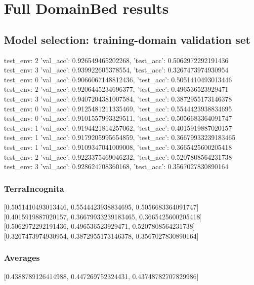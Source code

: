 \documentclass{article}
\begin{document}
\section{Full DomainBed results}

\subsection{Model selection: training-domain validation set}
test_env: 2
{'val_acc': 0.926549465202268, 'test_acc': 0.5062972292191436}
test_env: 3
{'val_acc': 0.939922605378554, 'test_acc': 0.3267473974930954}
test_env: 0
{'val_acc': 0.9066067148812436, 'test_acc': 0.5051410493013446}
test_env: 2
{'val_acc': 0.9206445234696377, 'test_acc': 0.496536523929471}
test_env: 3
{'val_acc': 0.9407204381007584, 'test_acc': 0.3872955173146378}
test_env: 0
{'val_acc': 0.9125481211335469, 'test_acc': 0.5544423938834695}
test_env: 0
{'val_acc': 0.9101557993329511, 'test_acc': 0.5056683364091747}
test_env: 1
{'val_acc': 0.9194421814257062, 'test_acc': 0.4015919887020157}
test_env: 1
{'val_acc': 0.9179205995654859, 'test_acc': 0.36679933239183465}
test_env: 1
{'val_acc': 0.9109347041009008, 'test_acc': 0.3665425600205418}
test_env: 2
{'val_acc': 0.9223375469046232, 'test_acc': 0.5207808564231738}
test_env: 3
{'val_acc': 0.928624708360168, 'test_acc': 0.3567027830890164}

\subsubsection{TerraIncognita}
[0.5051410493013446, 0.5544423938834695, 0.5056683364091747]
[0.4015919887020157, 0.36679933239183465, 0.3665425600205418]
[0.5062972292191436, 0.496536523929471, 0.5207808564231738]
[0.3267473974930954, 0.3872955173146378, 0.3567027830890164]

\begin{center}
\end{center}

\subsubsection{Averages}
[0.4388789126414988, 0.447269752324431, 0.43748782707829986]

\begin{center}
\end{center}
\end{document}
